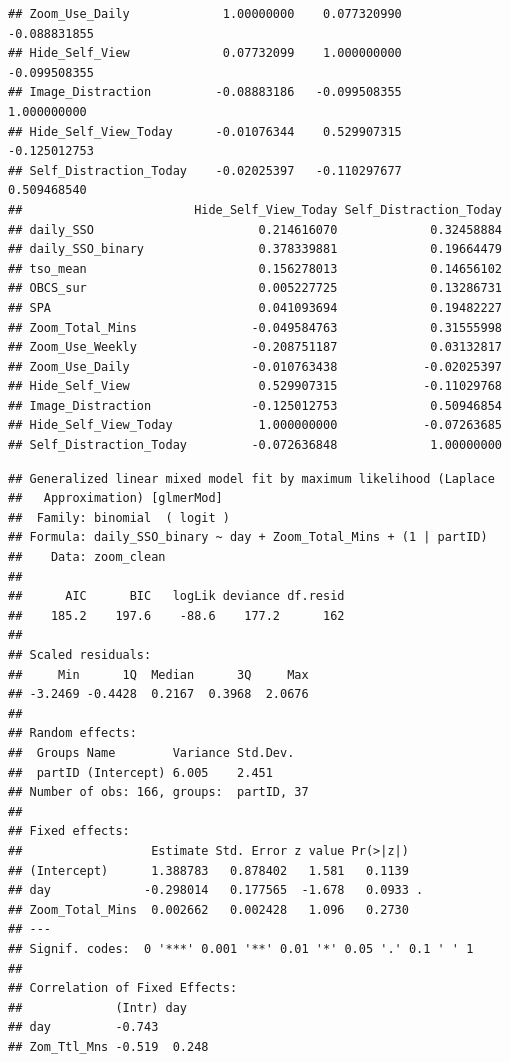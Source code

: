 \documentclass[
  english,
  man]{apa7}
\begin{document}
\begin{verbatim}
## Zoom_Use_Daily             1.00000000    0.077320990      -0.088831855
## Hide_Self_View             0.07732099    1.000000000      -0.099508355
## Image_Distraction         -0.08883186   -0.099508355       1.000000000
## Hide_Self_View_Today      -0.01076344    0.529907315      -0.125012753
## Self_Distraction_Today    -0.02025397   -0.110297677       0.509468540
##                        Hide_Self_View_Today Self_Distraction_Today
## daily_SSO                       0.214616070             0.32458884
## daily_SSO_binary                0.378339881             0.19664479
## tso_mean                        0.156278013             0.14656102
## OBCS_sur                        0.005227725             0.13286731
## SPA                             0.041093694             0.19482227
## Zoom_Total_Mins                -0.049584763             0.31555998
## Zoom_Use_Weekly                -0.208751187             0.03132817
## Zoom_Use_Daily                 -0.010763438            -0.02025397
## Hide_Self_View                  0.529907315            -0.11029768
## Image_Distraction              -0.125012753             0.50946854
## Hide_Self_View_Today            1.000000000            -0.07263685
## Self_Distraction_Today         -0.072636848             1.00000000
\end{verbatim}

\begin{verbatim}
## Generalized linear mixed model fit by maximum likelihood (Laplace
##   Approximation) [glmerMod]
##  Family: binomial  ( logit )
## Formula: daily_SSO_binary ~ day + Zoom_Total_Mins + (1 | partID)
##    Data: zoom_clean
## 
##      AIC      BIC   logLik deviance df.resid 
##    185.2    197.6    -88.6    177.2      162 
## 
## Scaled residuals: 
##     Min      1Q  Median      3Q     Max 
## -3.2469 -0.4428  0.2167  0.3968  2.0676 
## 
## Random effects:
##  Groups Name        Variance Std.Dev.
##  partID (Intercept) 6.005    2.451   
## Number of obs: 166, groups:  partID, 37
## 
## Fixed effects:
##                  Estimate Std. Error z value Pr(>|z|)  
## (Intercept)      1.388783   0.878402   1.581   0.1139  
## day             -0.298014   0.177565  -1.678   0.0933 .
## Zoom_Total_Mins  0.002662   0.002428   1.096   0.2730  
## ---
## Signif. codes:  0 '***' 0.001 '**' 0.01 '*' 0.05 '.' 0.1 ' ' 1
## 
## Correlation of Fixed Effects:
##             (Intr) day   
## day         -0.743       
## Zom_Ttl_Mns -0.519  0.248
\end{verbatim}
\end{document}
